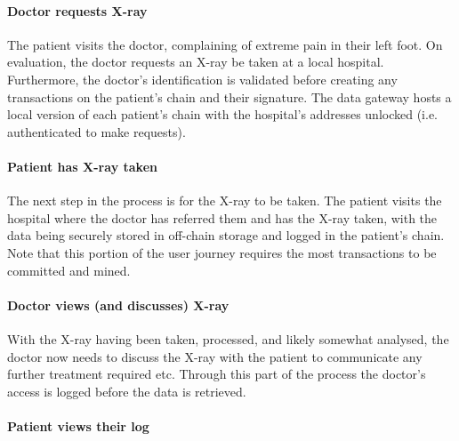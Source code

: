 \paragraph{Doctor requests X-ray}

The patient visits the doctor, complaining of extreme pain in their left foot. On evaluation, the doctor requests an X-ray be taken at a local hospital. Furthermore, the doctor's identification is validated before creating any transactions on the patient's chain and their signature. The data gateway hosts a local version of each patient's chain with the hospital's addresses unlocked (i.e. authenticated to make requests).





\paragraph{Patient has X-ray taken}

The next step in the process is for the X-ray to be taken. The patient visits the hospital where the doctor has referred them and has the X-ray taken, with the data being securely stored in off-chain storage and logged in the patient's chain. Note that this portion of the user journey requires the most transactions to be committed and mined.



\paragraph{Doctor views (and discusses) X-ray}

With the X-ray having been taken, processed, and likely somewhat analysed, the doctor now needs to discuss the X-ray with the patient to communicate any further treatment required etc. Through this part of the process the doctor's access is logged before the data is retrieved.



\paragraph{Patient views their log}




